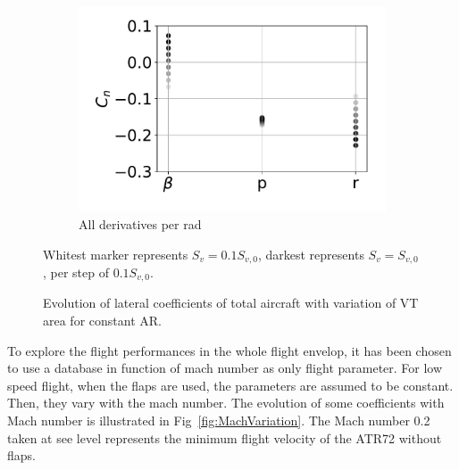 \begin{figure}[hbt!]
\begin{subfigure}[b]{0.33\textwidth}
		\includegraphics[width=1.0\textwidth]{CnCstAR}
		\caption{All derivatives per rad}
		\label{fig:CnCstAR}
	\end{subfigure}
	\caption{Evolution of lateral coefficients of total aircraft with variation of VT area for constant AR.} Whitest marker represents $S_v=0.1S_{v,0}$, darkest represents $S_v=S_{v,0}$, per step of $0.1S_{v,0}$.\label{fig:cstAR}
\end{figure}

To explore the flight performances in the whole flight envelop, it has been chosen to use a database in function of mach number as only flight parameter. For low speed flight, when the flaps are used, the parameters are assumed to be constant. Then, they vary with the mach number. The evolution of some coefficients with Mach number is illustrated in Fig~\ref{fig:MachVariation}. The Mach number 0.2 taken at see level represents the minimum flight velocity of the ATR72 without flaps.

